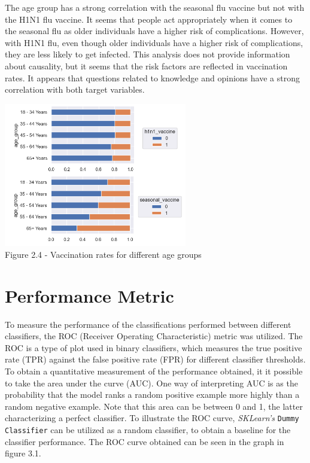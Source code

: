 \documentclass{IEEEtran}
\begin{document}
The age group has a strong correlation with the seasonal flu vaccine but not with the H1N1 flu vaccine. It seems that people act appropriately when it comes to the seasonal flu as older individuals have a higher risk of complications. However, with H1N1 flu, even though older individuals have a higher risk of complications, they are less likely to get infected. This analysis does not provide information about causality, but it seems that the risk factors are reflected in vaccination rates.
It appears that questions related to knowledge and opinions have a strong correlation with both target variables.

\begin{center}
    \includegraphics[width = 8cm]{figures/Age.png}\\
    Figure 2.4 - Vaccination rates for different age groups
\end{center}

\section{Performance Metric}
To measure the performance of the classifications performed between different classifiers, the ROC (Receiver Operating Characteristic) metric was utilized. The ROC is a type of plot used in binary classifiers, which measures the true positive rate (TPR) against the false positive rate (FPR) for different classifier thresholds. To obtain a quantitative measurement of the performance obtained, it it possible to take the area under the curve (AUC). One way of interpreting AUC is as the probability that the model ranks a random positive example more highly than a random negative example. Note that this area can be between 0 and 1, the latter characterizing a perfect classifier.
To illustrate the ROC curve, \textit{SKLearn's} \texttt{Dummy Classifier} \cite{b2} can be utilized as a random classifier, to obtain a baseline for the classifier performance. The ROC curve obtained can be seen in the graph in figure 3.1.
\end{document}
